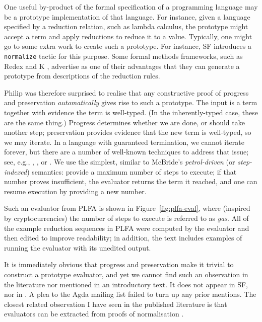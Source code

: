 \documentclass[preprint,authoryear]{elsarticle}
\begin{document}
One useful by-product of the formal specification of a programming
language may be a prototype implementation of that language.  For
instance, given a language specified by a reduction relation, such
as lambda calculus, the prototype might accept a term and apply reductions
to reduce it to a value.  Typically, one might go to some extra work to
create such a prototype.  For instance, SF introduces a \texttt{normalize}
tactic for this purpose.  Some formal methods frameworks, such as
Redex \citep{Felleisen-et-al-2009} and K \citep{Rosu-Serbanuta-2010},
advertise as one of their advantages that they can generate
a prototype from descriptions of the reduction rules.

Philip was therefore surprised to realise that any constructive proof of
progress and preservation \emph{automatically} gives rise to such a
prototype.  The input is a term together with evidence the term is
well-typed.  (In the inherently-typed case, these are the same thing.)
Progress determines whether we are done, or should take another step;
preservation provides evidence that the new term is well-typed, so we
may iterate. In a language with guaranteed termination, we cannot
iterate forever, but there are a number of well-known techniques to
address that issue; see, e.g., \citet{Bove-and-Capretta-2001},
\citet{Capretta-2005}, or \citet{McBride-2015}.
We use the simplest, similar to McBride's \emph{petrol-driven} (or
\emph{step-indexed}) semantics: provide a maximum number of steps to
execute; if that number proves insufficient, the evaluator returns the
term it reached, and one can resume execution by providing a new
number.

Such an evaluator from PLFA is shown in Figure~\ref{fig:plfa-eval},
where (inspired by cryptocurrencies) the number of steps
to execute is referred to as \emph{gas}. All of the example reduction
sequences in PLFA were computed by the evaluator and then edited to
improve readability; in addition, the text includes examples of
running the evaluator with its unedited output.

It is immediately obvious that progress and preservation make it
trivial to construct a prototype evaluator, and yet we cannot find such
an observation in the literature nor mentioned in an introductory
text.  It does not appear in SF, nor in \citet{Harper-2016}.  A plea
to the Agda mailing list failed to turn up any prior mentions.
The closest related observation I have seen in the published
literature is that evaluators can be extracted from proofs of
normalisation \citep{Berger-1993,Dagand-and-Scherer-2015}.
\end{document}
